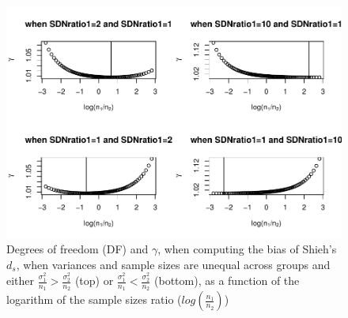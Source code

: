\documentclass[
  man]{apa6}
\begin{document}
\begin{figure}
\centering
\includegraphics{Theoretical-Bias-of-all-estimators-as-a-function-of-population-parameters_files/figure-latex/biasshiehhetunbalSDRNandnpairing2case2-1.pdf}
\caption{\label{fig:biasshiehhetunbalSDRNandnpairing2case2}Degrees of freedom (DF) and \(\gamma\), when computing the bias of Shieh's \(d_s\), when variances and sample sizes are unequal across groups and either \(\frac{\sigma^2_1}{n_1}>\frac{\sigma^2_2}{n_2}\) (top) or \(\frac{\sigma^2_1}{n_1}<\frac{\sigma^2_2}{n_2}\) (bottom), as a function of the logarithm of the sample sizes ratio (\(log \left( \frac{n_1}{n_2} \right)\))}
\end{figure}
\end{document}
